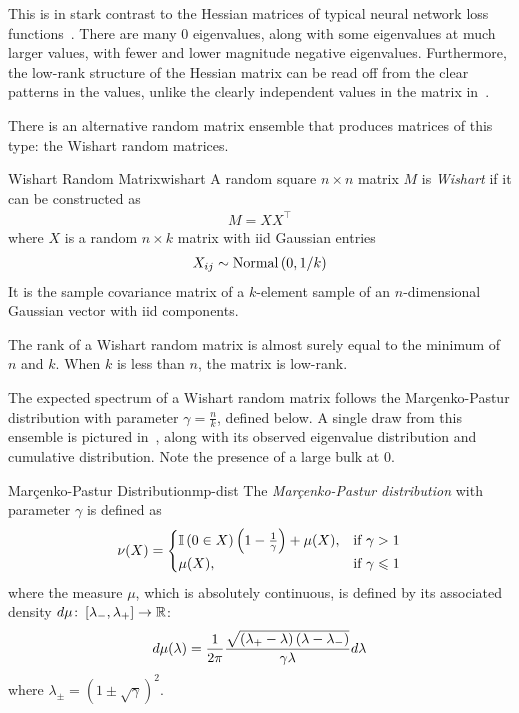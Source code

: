 \documentclass[../../thesis.tex]{subfiles}
\begin{document}
This is in stark contrast to the Hessian matrices
of typical neural network loss functions~\cite{sagun2017}.
There are many $0$ eigenvalues,
along with some eigenvalues at much larger values,
with fewer and lower magnitude negative eigenvalues.
Furthermore, the low-rank structure of the Hessian matrix
can be read off from the clear patterns in the values,
unlike the clearly independent values
in the matrix in~.

There is an alternative random matrix ensemble
that produces matrices of this type:
the Wishart random matrices.

\begin{definition}{Wishart Random Matrix}{wishart}
	A random square $n\times n$ matrix $M$ is \emph{Wishart}
	if it can be constructed as
	\begin{align}
		M = XX^\top
	\end{align}
	where $X$ is a random $n \times k$ matrix with
	iid Gaussian entries
	\begin{align}
		X_{ij} \sim \mathrm{Normal}\left(0, 1/k\right)
	\end{align}
	It is the sample covariance matrix of a $k$-element sample
	of an $n$-dimensional Gaussian vector with
	iid components.
\end{definition}

The rank of a Wishart random matrix is almost surely equal to
the minimum of $n$ and $k$.
When $k$ is less than $n$,
the matrix is low-rank.

The expected spectrum of a Wishart random matrix
follows the Mar{\c c}enko-Pastur distribution
with parameter $\gamma = \frac{n}{k}$,
defined below.
A single draw from this ensemble is pictured
in~,
along with its observed eigenvalue distribution
and cumulative distribution.
Note the presence of a large bulk at $0$.

\begin{definition}{Mar{\c c}enko-Pastur Distribution}{mp-dist}
	The \emph{Mar{\c c}enko-Pastur distribution}
	with parameter $\gamma$ is defined as
	\begin{equation}\equationlabel{def-mp-dist}
		\nu(X) =
			\begin{cases}
				\Ind\left(0 \in X\right)%
					\left(1-\frac{1}{\gamma}\right) + \mu(X),
				& \text{if } \gamma > 1\\
				\mu(X),
				& \text{if } \gamma \leq 1\\
			\end{cases}
	\end{equation}
	where the measure $\mu$,
	which is absolutely continuous, is defined
	by its associated density
	$d\mu\colon\left[\lambda_-, \lambda_+\right]\to\mathbb{R}$:
	\begin{equation}\equationlabel{def-mp-density}
		d\mu(\lambda) = \frac{1}{2\pi}%
		\frac{\sqrt{\left(\lambda_+ - \lambda\right)\left(\lambda-\lambda_-\right)}}%
		{\gamma\lambda} d\lambda
	\end{equation}
	where $\lambda_{\pm} = {\left(1 \pm \sqrt{\gamma}\right)}^2$.
\end{definition}
\end{document}
